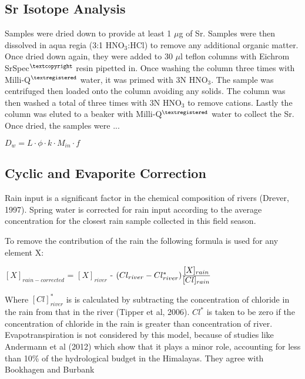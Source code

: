 
\subsection{Sr Isotope Analysis}

Samples were dried down to provide at least 1 $\mu$g of Sr. Samples were then dissolved in aqua regia (3:1 HNO$_3$:HCl) to remove any additional organic matter. Once dried down again, they were added to 30 $\mu$l teflon columns with Eichrom SrSpec$^{\textcopyright}$ resin pipetted in. Once washing the column three times with Milli-Q$^{\textregistered}$ water, it was primed with 3N HNO$_3$. The sample was centrifuged then loaded onto the column avoiding any solids. The column was then washed a total of three times with 3N HNO$_3$ to remove cations. Lastly the column was eluted to a beaker with Milli-Q$^{\textregistered}$ water to collect the Sr. Once dried, the samples were ...



$D_w = L \cdot \phi \cdot k \cdot M_{in} \cdot f$






\subsection{Cyclic and Evaporite Correction}

Rain input is a significant factor in the chemical composition of rivers (Drever, 1997).
Spring water is corrected for rain input according to the average concentration for the closest 
rain sample collected in this field season. %

\bsk

To remove the contribution of the rain the following formula is used for any element X:

\begin{center}
{\Large
$[X]_{rain-corrected}$  = $[X]_{river}$ - $(Cl_{river} - Cl^*_{river})\ddfrac{[X]_{rain}}{[Cl]_{rain}}$}

\end{center}

Where $[Cl]^*_{river}$ is is calculated by subtracting the concentration of chloride in the rain from that in the river (Tipper et al, 2006).
$Cl^{*}$ is taken to be zero if the concentration of chloride in the rain is greater than concentration of river. Evapotranspiration is not considered by this model, because of
studies like Andermann et al (2012) which show that it plays a minor role, accounting for less than 10\% of the hydrological budget in the Himalayas.
They agree with Bookhagen and Burbank



